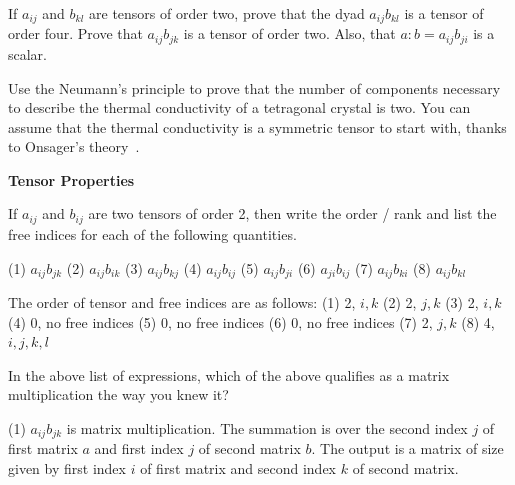 
\begin{question}
If $a_{ij}$ and $b_{kl}$ are tensors of order two, prove that the dyad $a_{ij} b_{kl}$ is a tensor of order four. Prove that $a_{ij} b_{jk}$ is a tensor of order two. Also, that $a:b = a_{ij}b_{ji}$ is a scalar.
\end{question}
\begin{solution}[print]
\end{solution}


\begin{question}
Use the Neumann's principle to prove that the number of components necessary to describe the thermal conductivity of a tetragonal crystal is two. You can assume that the thermal conductivity is a symmetric tensor to start with, thanks to Onsager's theory~\cite{onsager1, onsager2}.
\end{question}
\begin{solution}[print]
\end{solution}


\begin{center}
{\bf \Large Tensor Properties}
\end{center}


\begin{question}
If $a_{ij}$ and $b_{ij}$ are two tensors of order 2, then write the order / rank and list the free indices for each of the following quantities.

(1) $a_{ij} b_{jk}$ 
(2) $a_{ij} b_{ik}$ 
(3) $a_{ij} b_{kj}$ 
(4) $a_{ij} b_{ij}$ 
(5) $a_{ij} b_{ji}$ 
(6) $a_{ji} b_{ij}$ 
(7) $a_{ij} b_{ki}$ 
(8) $a_{ij} b_{kl}$ 

\end{question}
\begin{solution}[print]
The order of tensor and free indices are as follows:
(1) 2, $i,k$
(2) 2, $j,k$
(3) 2, $i,k$
(4) 0, no free indices
(5) 0, no free indices
(6) 0, no free indices
(7) 2, $j,k$
(8) 4, $i,j,k,l$

\end{solution}


\begin{question}
In the above list of expressions, which of the above qualifies as a matrix multiplication the way you knew it?
\end{question}
\begin{solution}[print]
(1) $a_{ij} b_{jk}$ is matrix multiplication. The summation is over the second index $j$ of first matrix $a$ and first index $j$ of second matrix $b$. The output is a matrix of size given by first index $i$ of first matrix and second index $k$ of second matrix.
\end{solution}

